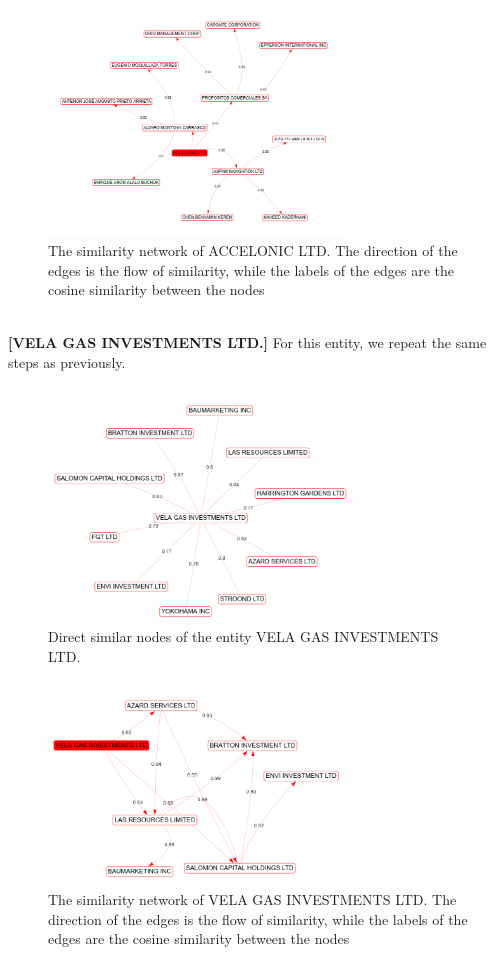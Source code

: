 \documentclass[sigconf, nonacm]{acmart}
\begin{document}
\begin{figure}[htp]
    \centering
    \includegraphics[width=8cm]{figures/accelonic_depth2.png}
    \caption{The similarity network of ACCELONIC LTD. The direction of the edges is the flow of similarity, while the labels of the edges are the cosine similarity between the nodes}
    \label{fig:galaxy}
\end{figure}
\\\textbf{[VELA GAS INVESTMENTS LTD.]} For this entity, we repeat the same steps as previously. 
\begin{figure}[htp]
    \centering
    \includegraphics[width=8cm]{figures/vela_gas_star.png}
    \caption{Direct similar nodes of the entity VELA GAS INVESTMENTS LTD.}
    \label{fig:galaxy}
\end{figure}
\begin{figure}[htp]
    \centering
    \includegraphics[width=8cm]{figures/vela_gas_depth2.png}
    \caption{The similarity network of VELA GAS INVESTMENTS LTD. The direction of the edges is the flow of similarity, while the labels of the edges are the cosine similarity between the nodes}
    \label{fig:galaxy}
\end{figure}
\end{document}

